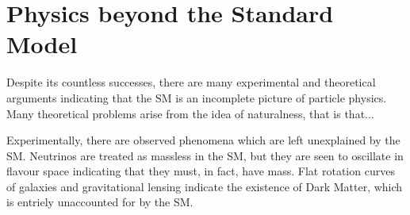 \section{Physics beyond the Standard Model}

Despite its countless successes,
there are many experimental and theoretical arguments indicating that the SM is an incomplete
picture of particle physics.
Many theoretical problems arise from the idea of naturalness, that is that...

Experimentally, there are observed phenomena which are left unexplained by the SM.
Neutrinos are treated as massless in the SM, but they are seen to oscillate in flavour space
indicating that they must, in fact, have mass.
Flat rotation curves of galaxies and gravitational lensing indicate the existence of Dark Matter,
which is entriely unaccounted for by the SM.

